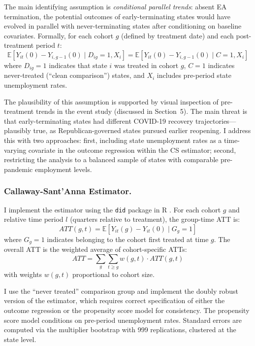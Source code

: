 \documentclass[12pt]{article}
\newcommand{\E}{\mathbb{E}}
\begin{document}
The main identifying assumption is \textit{conditional parallel trends}: absent EA termination, the potential outcomes of early-terminating states would have evolved in parallel with never-terminating states after conditioning on baseline covariates. Formally, for each cohort $g$ (defined by treatment date) and each post-treatment period $t$:
\begin{equation}
    \E[Y_{it}(0) - Y_{i,g-1}(0) \mid D_{ig} = 1, X_i] = \E[Y_{it}(0) - Y_{i,g-1}(0) \mid C = 1, X_i]
\end{equation}
where $D_{ig} = 1$ indicates that state $i$ was treated in cohort $g$, $C = 1$ indicates never-treated (``clean comparison'') states, and $X_i$ includes pre-period state unemployment rates.

The plausibility of this assumption is supported by visual inspection of pre-treatment trends in the event study (discussed in Section~5). The main threat is that early-terminating states had different COVID-19 recovery trajectories---plausibly true, as Republican-governed states pursued earlier reopening. I address this with two approaches: first, including state unemployment rates as a time-varying covariate in the outcome regression within the CS estimator; second, restricting the analysis to a balanced sample of states with comparable pre-pandemic employment levels.

\subsubsection*{Callaway-Sant'Anna Estimator.} I implement the \citet{callaway2021difference} estimator using the \texttt{did} package in R . For each cohort $g$ and relative time period $l$ (quarters relative to treatment), the group-time ATT is:
\begin{equation}
    ATT(g, t) = \E[Y_{it}(g) - Y_{it}(0) \mid G_g = 1]
\end{equation}
where $G_g = 1$ indicates belonging to the cohort first treated at time $g$. The overall ATT is the weighted average of cohort-specific ATTs:
\begin{equation}
    ATT = \sum_g \sum_{t \geq g} w(g, t) \cdot ATT(g, t)
\end{equation}
with weights $w(g, t)$ proportional to cohort size.

I use the ``never treated'' comparison group and implement the doubly robust version of the estimator, which requires correct specification of either the outcome regression or the propensity score model for consistency. The propensity score model conditions on pre-period unemployment rates. Standard errors are computed via the multiplier bootstrap with 999 replications, clustered at the state level.
\end{document}
